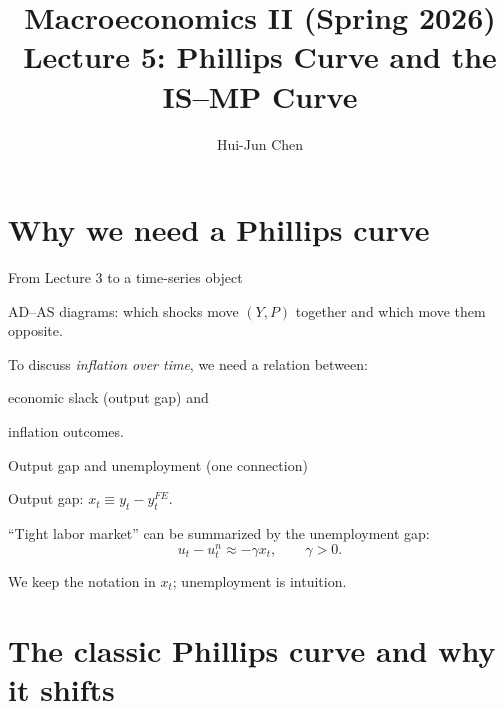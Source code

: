 \documentclass[aspectratio=169,xcolor=dvipsnames]{beamer}
\title[Phillips Curve]{Macroeconomics II (Spring 2026)\\\vspace{4pt}Lecture 5: Phillips Curve and the IS--MP Curve}
\author[Hui-Jun Chen]{Hui-Jun Chen}
\institute[]{National Tsing Hua University}
\date{}
\let\tempone\itemize
\let\temptwo\enditemize
\renewenvironment{itemize}{\tempone\addtolength{\itemsep}{\fill}}{\temptwo}
\begin{document}
\begin{frame}
    \titlepage
\end{frame}

\section{Why we need a Phillips curve}

\begin{frame}{From Lecture 3 to a time-series object}
\begin{itemize}
\item AD--AS diagrams: which shocks move $(Y,P)$ together and which move them opposite.
\item To discuss \emph{inflation over time}, we need a relation between:
\begin{itemize}
\item economic slack (output gap) and
\item inflation outcomes.
\end{itemize}
\end{itemize}
\end{frame}

\begin{frame}{Output gap and unemployment (one connection)}
\begin{itemize}
\item Output gap: $x_t \equiv y_t-y_t^{FE}$.
\item ``Tight labor market'' can be summarized by the unemployment gap:
\[
u_t-u_t^n \approx -\gamma x_t, \qquad \gamma>0.
\]
\item We keep the notation in $x_t$; unemployment is intuition.
\end{itemize}
\end{frame}

\section{The classic Phillips curve and why it shifts}
\end{document}
